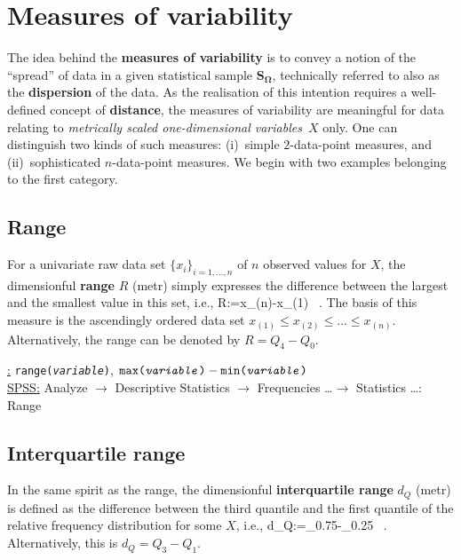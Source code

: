 \section[Measures of variability]{Measures of variability}
The idea behind the \textbf{measures of variability} is to convey a 
notion of the ``spread'' of data in a given statistical sample 
$\boldsymbol{S_{\Omega}}$, technically referred to also as the 
\textbf{dispersion} of the data. As the realisation of this
intention requires a well-defined concept of \textbf{distance}, 
the measures of variability are meaningful for data relating to 
\textit{metrically scaled one-dimensional variables}~$X$ only. One 
can distinguish two kinds of such measures: (i)~simple 
$2$-data-point measures, and (ii)~sophisticated $n$-data-point 
measures. We begin with two examples belonging to the first 
category.

\subsection[Range]{Range}
For a univariate raw data set $\{x_{i}\}_{i=1,\ldots,n}$ of $n$ 
observed values for $X$, the dimensionful \textbf{range} $R$ (metr) 
simply expresses the difference between the largest and the 
smallest value in this set, i.e.,
%
\be
{}
R:=x_{(n)}-x_{(1)} \ .
\ee
%
The basis of this measure is the ascendingly ordered data set 
$x_{(1)} \leq x_{(2)} \leq \ldots \leq x_{(n)}$. Alternatively, 
the range can be denoted by $R=Q_{4}-Q_{0}$.

\medskip
\noindent
\underline{\R:} \texttt{range(\textit{variable})},
$\texttt{max(\textit{variable})}
- \texttt{min(\textit{variable})}$ \\
\underline{SPSS:} Analyze $\rightarrow$ Descriptive Statistics
$\rightarrow$ Frequencies \ldots $\rightarrow$ Statistics
\ldots: Range

\subsection[Interquartile range]{Interquartile range}
In the same spirit as the range, the dimensionful
\textbf{interquartile range} $d_{Q}$ (metr) is defined as the 
difference between the third quantile and the first quantile of 
the relative frequency distribution for some $X$, i.e.,
%
\be
d_{Q}:=_{0.75}-_{0.25} \ .
\ee
%
Alternatively, this is $d_{Q}=Q_{3}-Q_{1}$.

